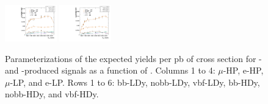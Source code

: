 \begin{figure}[htbp]
  \includegraphics[width=0.2\textwidth]{fig/analysis/paramSignalYield_NonVBFSig_mu_LP_vbf_DEtaHi.pdf}
  \includegraphics[width=0.2\textwidth]{fig/analysis/paramSignalYield_NonVBFSig_e_LP_vbf_DEtaHi.pdf}\\
  \caption{
    Parameterizations of the expected yields per pb of cross section for \ggF- and \DY-produced signals as a function of \MX.
    Columns 1 to 4: $\mu$-HP, e-HP, $\mu$-LP, and e-LP.
    Rows 1 to 6: bb-LDy, nobb-LDy, vbf-LDy, bb-HDy, nobb-HDy, and vbf-HDy.}
  \label{fig:YieldParam_NonVBF_Run2}
\end{figure}

